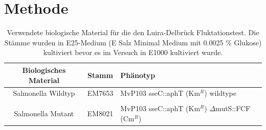 \documentclass[oneside,10pt,a4paper]{report}
\begin{document}
		\section{Methode}
			\begin{table}[H]
			\centering
			\caption{Verwendete biologische Material für die den Luira-Delbrück Fluktationstest. Die Stämme wurden in E25-Medium (E Salz Minimal Medium mit 0.0025 $\%$ Glukose) kultiviert bevor es im Versuch in E1000 kultiviert wurde.}
			\label{tab: exp4-biologisches Material}
			\begin{tabular}{ccp{7.5cm}}
				\toprule
				Biologisches Material& Stamm & Phänotyp\\
				\midrule
				\multirow{2}{*}{\parbox[t]{2cm}{Salmonella Wildtyp}}  & \multirow{2}{*}{EM7653} & \multirow{2}{*}{MvP103 sseC::aphT (Km$^R$) wildtype}\\
				&&\\
				&&\\
				\multirow{3}{*}{\parbox[t]{2cm}{Salmonella Mutant}} & \multirow{3}{*}{EM8021} &\multirow{3}{*}{MvP103 sseC::aphT (Km$^R$) $\Delta$mutS::FCF (Cm$^R$)} \\
				&&\\
				&&\\
				
				\bottomrule			
			\end{tabular}
		\end{table}
		
		
\end{document}
